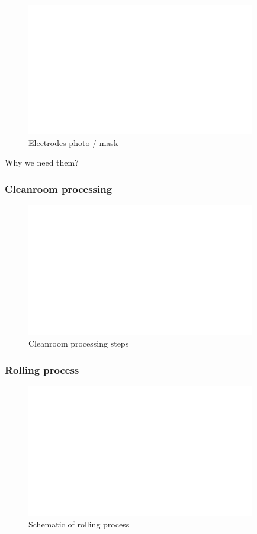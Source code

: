 \begin{figure}[h!]\centering \includegraphics[width=10cm,draft]{figures/foo.png}
      \caption{Electrodes photo / mask}
\end{figure}
Why we need them?


\subsubsection{Cleanroom processing}
\begin{figure}[h!]\centering \includegraphics[width=10cm,draft]{figures/foo.png}
      \caption{Cleanroom processing steps}
\end{figure}

\subsubsection{Rolling process}
\begin{figure}[h!]\centering \includegraphics[width=10cm,draft]{figures/foo.png}
      \caption{Schematic of rolling process}
\end{figure}

